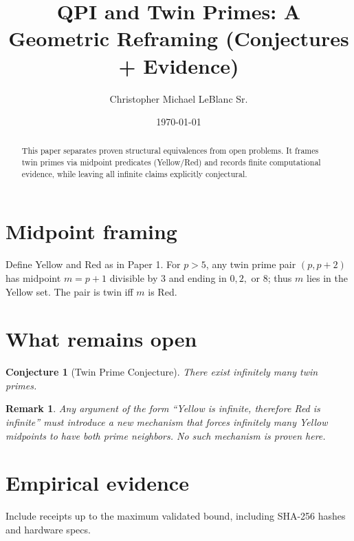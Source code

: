 \documentclass[11pt]{article}
\title{QPI and Twin Primes: A Geometric Reframing (Conjectures + Evidence)}
\author{Christopher Michael LeBlanc Sr.}
\date{\today}
\newtheorem{conjecture}{Conjecture}
\newtheorem{remark}{Remark}
\begin{document}
\maketitle

\begin{abstract}
This paper separates proven structural equivalences from open problems.
It frames twin primes via midpoint predicates (Yellow/Red) and records
finite computational evidence, while leaving all infinite claims explicitly conjectural.
\end{abstract}

\section{Midpoint framing}
Define Yellow and Red as in Paper 1. For $p>5$, any twin prime pair $(p,p+2)$
has midpoint $m=p+1$ divisible by $3$ and ending in $0,2,$ or $8$; thus $m$ lies in the Yellow set.
The pair is twin iff $m$ is Red.

\section{What remains open}
\begin{conjecture}[Twin Prime Conjecture]
There exist infinitely many twin primes.
\end{conjecture}

\begin{remark}
Any argument of the form ``Yellow is infinite, therefore Red is infinite'' must introduce
a new mechanism that forces infinitely many Yellow midpoints to have both prime neighbors.
No such mechanism is proven here.
\end{remark}

\section{Empirical evidence}
Include receipts up to the maximum validated bound, including SHA-256 hashes and hardware specs.
\end{document}
